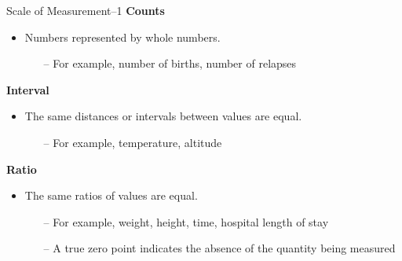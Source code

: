 \begin{frame}[t]{Scale of Measurement--1}
	\textbf{Counts}
	\begin{itemize}
		\item Numbers represented by whole numbers. 
		\begin{itemize}
			\item [--]For example, number of births, number of relapses
		\end{itemize}
	\end{itemize}
	
	\textbf{Interval}
	\begin{itemize}
		\item The same distances or intervals between values are equal.
		\begin{itemize}
			\item [--]For example, temperature, altitude
		\end{itemize}
	\end{itemize}

	\textbf{Ratio}
	\begin{itemize}
		\item The same ratios of values are equal.
		\begin{itemize}
			\item [--]For example, weight, height, time, hospital length of
			stay
			\item [--]A true zero point indicates the absence of the quantity
			being measured
		\end{itemize}
	\end{itemize}

\end{frame}

